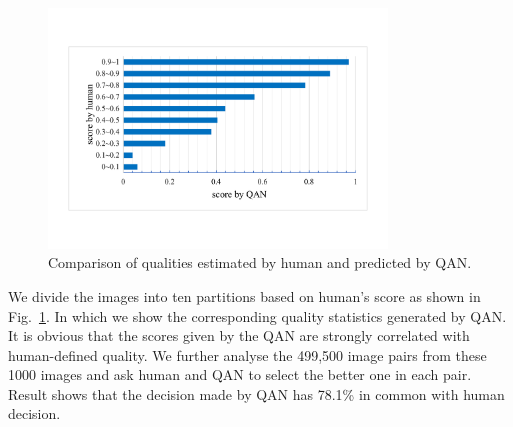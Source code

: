 \begin{figure}[!htb]
\centering
  \includegraphics[width=9cm]{quality2.pdf}
  \caption{Comparison of qualities estimated by human and predicted by QAN.}
  \label{fig:quality}
\endminipage\hfill

\end{figure}

We divide the images into ten partitions based on human's score as shown in Fig.~\ref{fig:quality}. In which we show the corresponding quality statistics generated by QAN. It is obvious that the scores given by the QAN are strongly correlated with human-defined quality. We further analyse the 499,500 image pairs from these 1000 images and ask human and QAN to select the better one in each pair.  Result shows that the decision made by QAN has 78.1\% in common with human decision.





